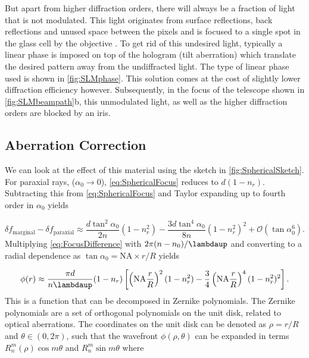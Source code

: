 But apart from higher diffraction orders, there will always be a fraction of light that is not modulated.
This light originates from surface reflections, back reflections and unused space between the pixels and is focused to a single spot in the glass cell by the objective \cite{Bijnen2013}.
To get rid of this undesired light, typically a linear phase is imposed on top of the hologram (tilt aberration) which translate the desired pattern away from the undiffracted light.
The type of linear phase used is shown in \cref{fig:SLMphase}.
This solution comes at the cost of slightly lower diffraction efficiency however. Subsequently, in the focus of the telescope shown in \cref{fig:SLMbeampath}b, this unmodulated light, as well as the higher diffraction orders are blocked by an iris. 

\subsection{Aberration Correction}\label{subsec:AberrationCorrection}


We can look at the effect of this material using the sketch in \cref{fig:SphericalSketch}. 
For paraxial rays, ($\alpha_0 \rightarrow 0$), \cref{eq:SphericalFocus} reduces to $d(1-n_r)$. 
Subtracting this from \cref{eq:SphericalFocus} and Taylor expanding up to fourth order in $\alpha_0$ yields 

\begin{equation}\label{eq:FocusDifference}
    \delta f_{\text{marginal}} - \delta f_{\text{paraxial}} \approx
    \frac{d \tan^2{\alpha_0}}{2n} (1-n_r^2) - \frac{3d \tan^4{\alpha_0}}{8n}(1-n_r^2)^2+\mathcal{O}(\tan\alpha_0^6).
\end{equation}
Multiplying \cref{eq:FocusDifference} with $2\pi(n-n_0)/\lambdaup$ and converting to a radial dependence as $\tan{\alpha_0}= \text{NA} \times r/R$ yields \cite{Iwaniuk2011}

\begin{equation}\label{eq:ConversionRadial}
    \phi(r) \approx \frac{\pi d}{n\lambdaup}(1-n_r)\left[
    \left(\text{NA}\frac{r}{R}\right)^2(1-n_r^2)-\frac{3}{4}\left(\text{NA}\frac{r}{ R}\right)^4(1-n_r^2)^2
    \right].
\end{equation}
This is a function that can be decomposed in Zernike polynomials.
The Zernike polynomials are a set of orthogonal polynomials on the unit disk, related to optical aberrations. 
The coordinates on the unit disk can be denoted as $\rho = r/R$ and $\theta \in (0, 2\pi)$, such that the wavefront $\phi(\rho,\theta)$ can be expanded in terms $R_n^m(\rho)\cos{m\theta}$ and $R_n^m\sin{m\theta}$ where 

